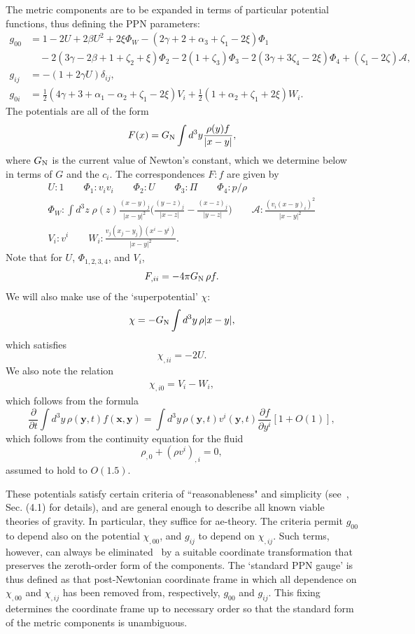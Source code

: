 \documentclass[aps,prd,preprint,amsmath,amssymb]{revtex4}
\def\beq{\begin{equation}}
\def\eeq{\end{equation}}
\def\half{\frac{1}{2}}
\begin{document}
The metric components are to be expanded in terms of particular
potential functions, thus defining the PPN parameters:
%
\beq\label{STNDRD}
\begin{split}
    g_{00} &= 1-2U+2\beta
        U^2+2\xi\Phi_W-(2\gamma+2+\alpha_3+\zeta_1-2\xi)\Phi_1\\
        &\quad-2(3\gamma-2\beta+1+\zeta_2+\xi)\Phi_2 
        -2(1+\zeta_3)\Phi_3-2(3\gamma+3\zeta_4-2\xi)\Phi_4
	+(\zeta_1-2\zeta)\mathcal{A},\\
    g_{ij}&=-(1+2\gamma U)\delta_{ij},\\
    g_{0i}&=\half(4\gamma+3+\alpha_1-\alpha_2+\zeta_1-2\xi)V_i
        +\half(1+\alpha_2+\zeta_1+2\xi)W_i.
\end{split}\eeq
%
The potentials are all of the form
%
\beq
    F(x) =G_{\rm N} \int d^3y \frac{\rho(y)f}{|x-y|},
\eeq
%
where $G_{\rm N}$ is the current value of Newton's constant, which
we determine below in terms of $G$ and the $c_i$. The
correspondences $F:f$ are given by
%
\begin{gather}\label{POTS}
    U:1\qquad
    \Phi_1 : v_i v_i\qquad
    \Phi_2 : U\qquad
    \Phi_3 : \Pi\qquad
    \Phi_4 : p/\rho\nonumber\\
    \Phi_W : \int d^3z\;
    \rho(z)\frac{(x-y)_j}{|x-y|^2}
    \Big(\frac{(y-z)_j}{|x-z|}-\frac{(x-z)_j}{|y-z|}\Big)\qquad
    \mathcal{A} : \frac{(v_i (x-y)_i)^2}{|x-y|^2}\\
    V_i : v^i\qquad
    W_i : \frac{v_j (x_j - y_j)(x^i -y^i)}{|x-y|^2}\nonumber.
\end{gather}
%
Note that for $U$, $\Phi_{1,2,3,4}$, and $V_i$,
%
\beq
    F_{,ii} = -4 \pi G_{\rm N}\, \rho f.
\eeq
%
We will also make use of the `superpotential' $\chi$:
%
\beq \chi = -G_{\rm N} \int d^3y\, \rho |x-y|, \eeq
%
which satisfies
%
\beq\label{chi}
    \chi_{,ii} = -2 U.
\eeq
%
We also note the relation
%
\begin{gather}\label{XVW}
    \chi_{,i0} = V_i - W_i,
\end{gather}
%
which follows from the formula
%
\beq
    \frac{\partial}{\partial t}\int d^3y\,
        \rho(\mathbf{y},t) f(\mathbf{x,y})
        = \int d^3y\,\rho(\mathbf{y},t)
            v^i(\mathbf{y},t)\frac{\partial f}{\partial y^i}
                [1+O(1)],
\eeq
%
which follows from the continuity equation for the fluid
%
\beq
    \rho_{,0} + (\rho v^i)_{,i} = 0,
\eeq
%
assumed to hold to $O(1.5)$.

 These potentials satisfy certain criteria of
``reasonableness" and simplicity (see~\cite{WillBook}, Sec. (4.1)
for details), and are general enough to describe all known viable
theories of gravity.  In particular, they suffice for ae-theory.
The criteria permit $g_{00}$ to depend also on the potential
$\chi_{,00}$, and $g_{ij}$ to depend on $\chi_{,ij}$. Such terms,
however, can always be eliminated~\cite{WillBook} by a suitable
coordinate transformation that preserves the zeroth-order form of
the components. The `standard PPN gauge' is thus defined as that
post-Newtonian coordinate frame in which all dependence on
$\chi_{,00}$ and $\chi_{,ij}$ has been removed from, respectively,
$g_{00}$ and $g_{ij}$. This fixing determines the coordinate frame
up to necessary order so that the standard form of the metric
components is unambiguous.
\end{document}
